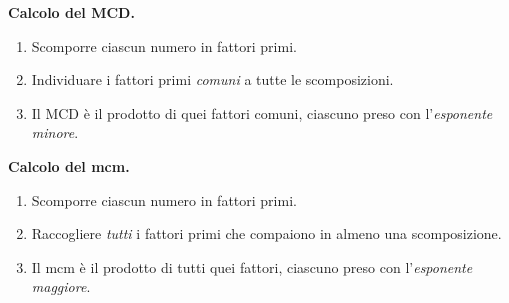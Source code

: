 \begin{regola}
    \textbf{Calcolo del MCD.}
    \begin{enumerate}[leftmargin=1.5em]
        \item Scomporre ciascun numero in fattori primi.
        \item Individuare i fattori primi \emph{comuni} a tutte le scomposizioni.
        \item Il MCD è il prodotto di quei fattori comuni, ciascuno preso con
              l'\emph{esponente minore}.
    \end{enumerate}

    \textbf{Calcolo del mcm.}
    \begin{enumerate}[leftmargin=1.5em]
        \item Scomporre ciascun numero in fattori primi.
        \item Raccogliere \emph{tutti} i fattori primi che compaiono in almeno
              una scomposizione.
        \item Il mcm è il prodotto di tutti quei fattori, ciascuno preso con
              l'\emph{esponente maggiore}.
    \end{enumerate}
\end{regola}

